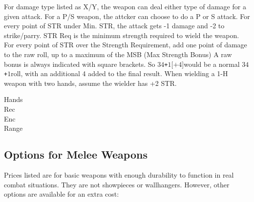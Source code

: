 \documentclass[twoside]{book}
\begin{document}
    {  
      For damage type listed as X/Y, the weapon can deal
             either type of damage for a given attack. For a P/S weapon,
             the attcker can choose to do a P or S attack. For every
             point of STR under Min. STR, the attack gets -1 damage and
             -2 to strike/parry. STR Req is the minimum strength required
             to wield the weapon. For every point of STR over the
             Strength Requirement, add one point of damage to the raw
             roll, up to a maximum of the MSB (Max Strength Bonus) A raw
             bonus is always indicated with square brackets. So \ensuremath{3}\ensuremath{4}\texttt{+}\ensuremath{1}\textscbf{}[\ensuremath{\texttt{+}\ensuremath{4}}]would be a normal \ensuremath{3}\ensuremath{4}\texttt{+}\ensuremath{1}roll, with an additional 4
             added to the final result. When wielding a 1-H weapon with
             two hands, assume the wielder has +2 STR. 
    }
  
\begin{description}
    
  \item[ Hands ] 
  \item[ Rec ] 
  \item[ Enc ] 
  \item[ Range ] 
\end{description}
  
    

\subsection{Options for Melee Weapons}
    
    {  
      Prices listed are for basic weapons with enough
               durability to function in real combat situations. They are
               not showpieces or wallhangers. However, other options are
               available for an extra cost: 
    }
  
\end{document}
